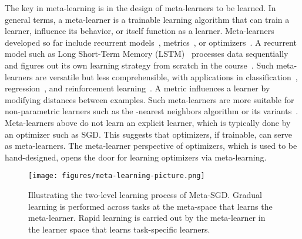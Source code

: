 \documentclass{article}
\begin{document}
The key in meta-learning is in the design of meta-learners to be learned. In general terms,
a meta-learner is a trainable learning algorithm that can train a learner,
influence its behavior, or itself function as a learner.
Meta-learners developed so far include recurrent models~\cite{hochreiter2001learning,santoro2016meta,wang2016learning,Yan2016reinf}, metrics~\cite{koch2015siamese,vinyals2016matching}, or optimizers~\cite{andrychowicz2016learning,li2016learning,ravi2017optimization,finn2017model}.
A recurrent model such as Long Short-Term Memory (LSTM)~\cite{hochreiter1997long} processes data sequentially and figures out its own learning strategy from scratch in the course~\cite{santoro2016meta}. Such meta-learners are versatile but less comprehensible, with applications in classification~\cite{santoro2016meta}, regression~\cite{hochreiter2001learning,santoro2016meta}, and reinforcement learning~\cite{wang2016learning,Yan2016reinf}.
A metric influences a learner by modifying distances between examples. Such meta-learners are more suitable for non-parametric learners such as the -nearest neighbors algorithm or its variants~\cite{vinyals2016matching,koch2015siamese}. Meta-learners above do not learn an explicit learner, which is typically done by an optimizer such as SGD. This suggests that optimizers, if trainable, can serve as meta-learners. The meta-learner perspective of optimizers, which is used to be hand-designed, opens the door for learning optimizers via meta-learning.



\begin{figure}
  \centering
  \texttt{[image: figures/meta-learning-picture.png]}
  \caption{Illustrating the two-level learning process of Meta-SGD. Gradual learning is performed across tasks at the meta-space  that learns the meta-learner. Rapid learning is carried out by the meta-learner in the learner space  that learns task-specific learners.
}
  \label{fig:meta-learning-process}
  \vspace{-0pt}
\end{figure}
\end{document}

